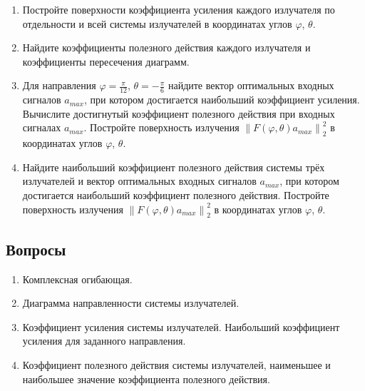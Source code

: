 \documentclass[a4paper,12pt]{article}
\newcommand{\snorm}[1]{\left\| #1 \right\|_2}
\begin{document}
\begin{enumerate}
    \item Постройте поверхности коэффициента усиления каждого излучателя по отдельности и всей системы излучателей
        в координатах углов $\varphi$, $\theta$.
    \item Найдите коэффициенты полезного действия каждого излучателя и коэффициенты пересечения диаграмм.
    \item Для направления $\varphi = \frac{\pi}{12}$, $\theta = -\frac{\pi}{6}$ найдите вектор оптимальных входных сигналов $a_{max}$,
        при котором достигается наибольший коэффициент усиления. Вычислите достигнутый коэффициент полезного действия при входных сигналах $a_{max}$.
        Постройте поверхность излучения $\snorm{F(\varphi, \theta) a_{max}}^2$ в координатах углов $\varphi$, $\theta$. 
    \item Найдите наибольший коэффициент полезного действия системы трёх излучателей и вектор оптимальных входных сигналов $a_{max}$,
        при котором достигается наибольший коэффициент полезного действия. Постройте поверхность излучения $\snorm{F(\varphi, \theta) a_{max}}^2$
        в координатах углов $\varphi$, $\theta$.
\end{enumerate}

\subsection{Вопросы}

\begin{enumerate}
    \item Комплексная огибающая.
    \item Диаграмма направленности системы излучателей.
    \item Коэффициент усиления системы излучателей. Наибольший коэффициент усиления для заданного направления.
    \item Коэффициент полезного действия системы излучателей, наименьшее и наибольшее значение коэффициента полезного действия.
\end{enumerate}
\end{document}
